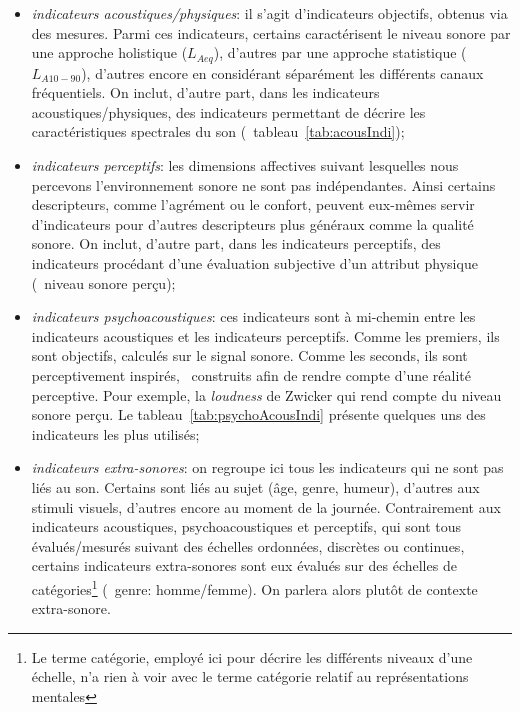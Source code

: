 \begin{itemize}
\begin{itemize}
\item \emph{indicateurs acoustiques/physiques}: il s'agit d'indicateurs objectifs, obtenus via des mesures. Parmi ces indicateurs, certains caractérisent le niveau sonore par une approche holistique ($L_{Aeq}$), d'autres par une approche statistique ($L_{A10-90}$), d'autres encore en considérant séparément les différents canaux fréquentiels. On inclut, d'autre part, dans les indicateurs acoustiques/physiques, des indicateurs permettant de décrire les caractéristiques spectrales du son (\cf~tableau~\ref{tab:acousIndi});

\item \emph{indicateurs perceptifs}: les dimensions affectives suivant lesquelles nous percevons l'environnement sonore ne sont pas indépendantes. Ainsi certains descripteurs, comme l'agrément ou le confort, peuvent eux-mêmes servir d'indicateurs pour d'autres descripteurs plus généraux comme la qualité sonore. On inclut, d'autre part, dans les indicateurs perceptifs, des indicateurs procédant d'une évaluation subjective d'un attribut physique (\eg~niveau sonore perçu);

\item \emph{indicateurs psychoacoustiques}: ces indicateurs sont à mi-chemin entre les indicateurs acoustiques et les indicateurs perceptifs. Comme les premiers, ils sont objectifs, calculés sur le signal sonore. Comme les seconds, ils sont perceptivement inspirés, \ie~construits afin de rendre compte d'une réalité perceptive. Pour exemple, la \emph{loudness} de Zwicker \citep{zwicker2013psychoacoustics} qui rend compte du niveau sonore perçu. Le tableau~\ref{tab:psychoAcousIndi} présente quelques uns des indicateurs les plus utilisés;

\item \emph{indicateurs extra-sonores}: on regroupe ici tous les indicateurs qui ne sont pas liés au son. Certains sont liés au sujet (âge, genre, humeur), d'autres aux stimuli visuels, d'autres encore au moment de la journée. Contrairement aux indicateurs acoustiques, psychoacoustiques et perceptifs, qui sont tous évalués/mesurés suivant des échelles ordonnées, discrètes ou continues, certains indicateurs extra-sonores sont eux évalués sur des échelles de catégories\footnote{Le terme catégorie, employé ici pour décrire les différents niveaux d'une échelle, n'a rien à voir avec le terme catégorie relatif au représentations mentales} (\eg~genre: homme/femme). On parlera alors plutôt de contexte extra-sonore.
\end{itemize}

\end{itemize}

